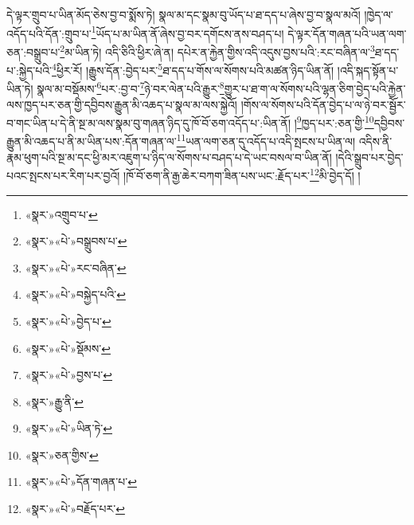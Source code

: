 དེ་ལྟར་གྲུབ་པ་ཡིན་མོད་ཅེས་བྱ་བ་སྨོས་ཏེ། སྣལ་མ་དང་སྣམ་བུ་ཡོད་པ་ཐ་དད་པ་ཞེས་བྱ་བ་སྣལ་མའོ། །ཁྱེད་ལ་འདོད་པའི་དོན་:གྲུབ་པ་\footnote{«སྣར་»འགྲུབ་པ་}ཡོད་པ་མ་ཡིན་ནོ་ཞེས་བྱ་བར་དགོངས་ནས་བཤད་པ། དེ་ལྟར་དོན་གཞན་པའི་ཡན་ལག་ཅན་:བསྒྲུབ་པ་\footnote{«སྣར་»«པེ་»བསྒྲུབས་པ་}མ་ཡིན་ཏེ། འདི་ཅིའི་ཕྱིར་ཞེ་ན། དཔེར་ན་རྐྱེན་གྱིས་འདི་འདུས་བྱས་པའི་:རང་བཞིན་ལ་\footnote{«སྣར་»«པེ་»རང་བཞིན་}ཐ་དད་པ་:སྐྱེད་པའི་\footnote{«སྣར་»«པེ་»བསྐྱེད་པའི་}ཕྱིར་རོ། །རྒྱུས་དོན་:བྱེད་པར་\footnote{«སྣར་»«པེ་»བྱེད་པ་}ཐ་དད་པ་གོས་ལ་སོགས་པའི་མཚན་ཉིད་ཡིན་ནོ། །འདི་སྐད་སྟོན་པ་ཡིན་ཏེ། སྣལ་མ་བསྡོམས་\footnote{«སྣར་»«པེ་»སྡོམས་}པར་:བྱ་བ་\footnote{«སྣར་»«པེ་»བྱས་པ་}ཉེ་བར་ལེན་པའི་རྒྱུར་\footnote{«སྣར་»རྒྱུ་ནི་}གྱུར་པ་ཐ་ག་ལ་སོགས་པའི་ལྷན་ཅིག་བྱེད་པའི་རྐྱེན་ལས་ཁྱད་པར་ཅན་གྱི་དབྱིབས་རྒྱུན་མི་འཆད་པ་སྣལ་མ་ལས་སྐྱེའོ། །གོས་ལ་སོགས་པའི་དོན་བྱེད་པ་ལ་ཉེ་བར་སྦྱོར་བ་གང་ཡིན་པ་དེ་ནི་སྔ་མ་ལས་སྣམ་བུ་གཞན་ཉིད་དུ་ཁོ་བོ་ཅག་འདོད་པ་:ཡིན་ནོ། །\footnote{«སྣར་»«པེ་»ཡིན་ཏེ་}ཁྱད་པར་:ཅན་གྱི་\footnote{«སྣར་»ཅན་གྱིས་}དབྱིབས་རྒྱུན་མི་འཆད་པ་ནི་མ་ཡིན་པས་:དོན་གཞན་ལ་\footnote{«སྣར་»«པེ་»དོན་གཞན་པ་}ཡན་ལག་ཅན་དུ་འདོད་པ་འདི་སྤངས་པ་ཡིན་ལ། འདིས་ནི་རྣམ་ཕུག་པའི་སྔ་མ་དང་ཕྱི་མར་འཇུག་པ་ཉིད་ལ་སོགས་པ་བཤད་པ་དེ་ཡང་བསལ་བ་ཡིན་ནོ། །དེའི་སྒྲུབ་པར་བྱེད་པའང་སྤངས་པར་རིག་པར་བྱའོ། །ཁོ་བོ་ཅག་ནི་རྒྱ་ཆེར་བཀག་ཟིན་པས་ཡང་:རྗོད་པར་\footnote{«སྣར་»«པེ་»བརྗོད་པར་}མི་བྱེད་དོ། །
